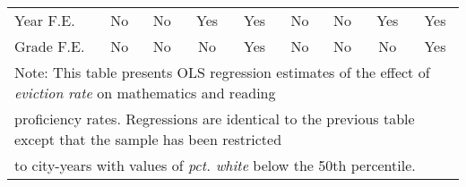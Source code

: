 \begin{table}[htbp]
\begin{tabular}{l*{8}{c}}
Year F.E.           &          No         &          No         &         Yes         &         Yes         &          No         &          No         &         Yes         &         Yes         \\
Grade F.E.          &          No         &          No         &          No         &         Yes         &          No         &          No         &          No         &         Yes         \\
\bottomrule
\multicolumn{9}{l}{\footnotesize Note: This table presents OLS regression estimates of the effect of \emph{eviction rate} on mathematics and reading}\\
\multicolumn{9}{l}{\footnotesize proficiency rates. Regressions are identical to the previous table except that the sample has been restricted}\\
\multicolumn{9}{l}{\footnotesize to city-years with values of \emph{pct. white} below the 50th percentile.}\\
\end{tabular}
\end{table}

